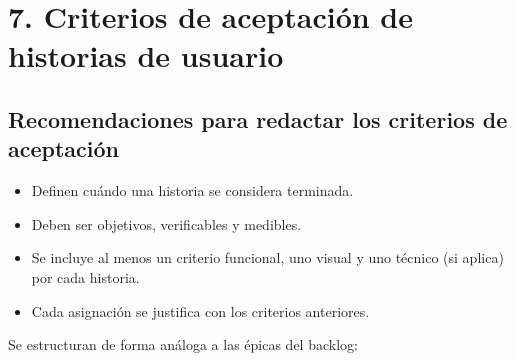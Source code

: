 \documentclass[
11pt, %
]{charter}
\begin{document}
\section{7. Criterios de aceptación de historias de usuario}
\label{sec:criteriosAceptacion}

\subsection*{Recomendaciones para redactar los criterios de aceptación}
\begin{itemize}
    \item Definen cuándo una historia se considera terminada.
    \item Deben ser objetivos, verificables y medibles.
    \item Se incluye al menos un criterio funcional, uno visual y uno técnico (si aplica) por cada historia.
    \item Cada asignación se justifica con los criterios anteriores.
\end{itemize}

Se estructuran de forma análoga a las \'{e}picas del backlog:
\end{document}
